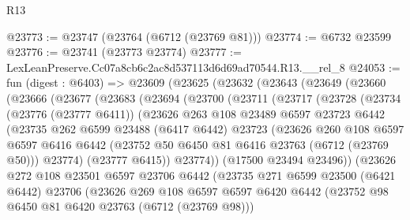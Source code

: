 \begin{lexlean}{R13}
\begin{coremodule}
@23773 := @23747 (@23764 (@6712 (@23769 @81)))
@23774 := @6732 @23599
@23776 := @23741 (@23773 @23774)
@23777 := LexLeanPreserve.Cc07a8cb6c2ac8d537113d6d69ad70544.R13.__rel_8
@24053 := fun (digest : @6403) =>
  @23609
    (@23625
      (@23632
        (@23643
          (@23649
            (@23660
              (@23666
                (@23677
                  (@23683
                    (@23694
                      (@23700
                        (@23711
                          (@23717
                            (@23728
                              (@23734
                                (@23776 (@23777 @6411))
                                (@23626
                                  @263
                                  @108
                                  @23489
                                  @6597
                                  @23723
                                  @6442
                                  (@23735
                                    @262
                                    @6599
                                    @23488
                                    (@6417 @6442)
                                    @23723
                                    (@23626
                                      @260
                                      @108
                                      @6597
                                      @6597
                                      @6416
                                      @6442
                                      (@23752 @50 @6450 @81 @6416 @23763 (@6712 (@23769 @50)))
                                      @23774)
                                    (@23777 @6415))
                                  @23774))
                              (@17500 @23494 @23496))
                            (@23626
                              @272
                              @108
                              @23501
                              @6597
                              @23706
                              @6442
                              (@23735
                                @271
                                @6599
                                @23500
                                (@6421 @6442)
                                @23706
                                (@23626
                                  @269
                                  @108
                                  @6597
                                  @6597
                                  @6420
                                  @6442
                                  (@23752 @98 @6450 @81 @6420 @23763 (@6712 (@23769 @98)))

\end{coremodule}
\end{lexlean}
